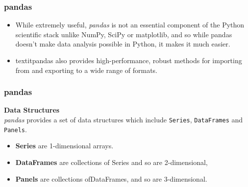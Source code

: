 \documentclass[MASTER.tex]{subfiles}
\begin{document}
\begin{frame}
	\frametitle{pandas}
	\Large


	\begin{itemize}
	\item While extremely useful, \textit{pandas} is not an essential
	component of the Python scientific stack unlike NumPy, SciPy or matplotlib, and so while pandas doesn’t
	make data analysis possible in Python, it makes it much easier. \item textit{pandas} also provides high-performance,
	robust methods for importing from and exporting to a wide range of formats.
	\end{itemize}
\end{frame}
\begin{frame}
	\frametitle{pandas}
\Large
\noindent \textbf{Data Structures}\\

\textit{pandas} provides a set of data structures which include \texttt{Series}, \texttt{DataFrames} and \texttt{Panels}.
\begin{itemize}
\item \textbf{Series} are 1-dimensional
	arrays.
	\item \textbf{DataFrames} are collections of Series and so are 2-dimensional, 
\item  \textbf{Panels} are collections ofDataFrames,
	and so are 3-dimensional.
	\end{itemize}
\end{frame}
\end{document}
